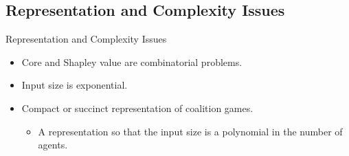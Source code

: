\documentclass{beamer}
\begin{document}
\subsection{Representation and Complexity Issues}
\begin{frame}{Representation and Complexity Issues}
    \begin{itemize}
        \item Core and Shapley value are combinatorial problems.
        \item Input size is exponential.
        \item Compact or succinct representation of coalition games.
        \begin{itemize}
            \item A representation so that the input size is a polynomial in the number of agents.
        \end{itemize}
    \end{itemize}
\end{frame}
\end{document}
